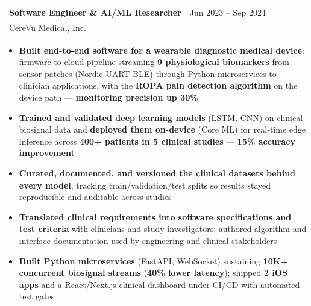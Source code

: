\documentclass[10.5pt,letterpaper]{article}
\makeatletter
\newcommand{\cventry}[5]{%
  \noindent\begin{tabularx}{\textwidth}{@{}X r@{}}
    {\bfseries\color{headerblue}#2} & {\color{graytext}#1} \\
    {\color{accentcolor}#3}\enskip{\color{lightgray}#4} & \\
  \end{tabularx}%
  \vspace{0.02em}%
  #5%
  \vspace{0.05em}%
}
\makeatother
\begin{document}
\cventry{Jun 2023 -- Sep 2024}{Software Engineer \& AI/ML Researcher \enspace{\color{graytext}\normalsize(Medical Device Software)}}{CereVu Medical, Inc.}{San Francisco Bay Area, CA (Remote)}{
\begin{itemize}[leftmargin=0.4cm, itemsep=0.02cm, topsep=0.04cm, label={\color{goldaccent}\textbullet}]
  \item \textbf{Built end-to-end software for a wearable diagnostic medical device}: firmware-to-cloud pipeline streaming \textbf{9 physiological biomarkers} from sensor patches (Nordic UART BLE) through Python microservices to clinician applications, with the \textbf{ROPA pain detection algorithm} on the device path --- \textbf{monitoring precision up 30\%}
  \item \textbf{Trained and validated deep learning models} (LSTM, CNN) on clinical biosignal data and \textbf{deployed them on-device} (Core ML) for real-time edge inference across \textbf{400+ patients in 5 clinical studies} --- \textbf{15\% accuracy improvement}
  \item \textbf{Curated, documented, and versioned the clinical datasets behind every model}, tracking train/validation/test splits so results stayed reproducible and auditable across studies
  \item \textbf{Translated clinical requirements into software specifications and test criteria} with clinicians and study investigators; authored algorithm and interface documentation used by engineering and clinical stakeholders
  \item \textbf{Built Python microservices} (FastAPI, WebSocket) sustaining \textbf{10K+ concurrent biosignal streams} (\textbf{40\% lower latency}); shipped \textbf{2 iOS apps} and a React/Next.js clinical dashboard under CI/CD with automated test gates
\end{itemize}
}
\end{document}
